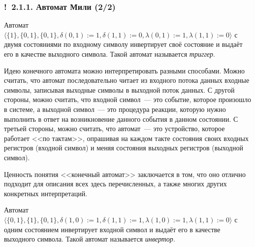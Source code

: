 \documentclass[mathserif,12pt,aspectratio=169]{beamer}
\renewcommand{\index}[1]{}
\def\odmkey#1#2{{\it\color{red} #1}\index{#2}}
\def\Assign{\operatorname{:=}}
\def\Ok{{\color{green}\textbf{!}\ }}
\begin{document}
\begin{frame}
\frametitle{\Ok 2.1.1. Автомат Мили (2/2)}
\begin{example}
Автомат $\langle \{1\},
\{0,1\}, \{0,1\},\delta(0,1)\Assign 1,
\delta(1,1)\Assign 0, \lambda(0,1)\Assign 1,\lambda(1,1)\Assign 0\rangle$
с двумя состояниями
по входному символу инвертирует своё состояние
и выдаёт его в качестве выходного символа.
Такой автомат называется \odmkey{триггер}{Триггер}.   
\end{example}
\begin{digress}
Идею конечного автомата можно интерпретировать разными способами.
Можно считать, что  автомат последовательно читает из входного
потока данных входные символы, записывая выходные символы в
выходной поток данных. С другой стороны, можно считать, что
входной символ~--- это событие, которое произошло в системе, а
выходной символ~--- это процедура реакции, которую нужно выполнить
в ответ на возникновение данного события в данном состоянии. С
третьей стороны, можно считать, что автомат~--- это устройство,
которое работает <<по тактам>>, опрашивая на каждом такте
состояния своих входных регистров (входной символ) и меняя
состояния выходных регистров (выходной символ).

\smallskip
Ценность понятия <<конечный автомат>> заключается в том, что оно
отлично подходит для описания всех здесь перечисленных, а также
многих других конкретных интерпретаций.
\end{digress}

\medskip
\begin{example}
Автомат $\langle \{0, 1\},
\{1\}, \{0,1\},\delta(1,0)\Assign 1,
\delta(1,1)\Assign 1, \lambda(1,0)\Assign 1,\lambda(1,1)\Assign 0\rangle$
с одним состоянием
 инвертирует входной символ 
и выдаёт его в качестве выходного символа.
Такой автомат называется \odmkey{инвертор}{Инвертор}.   
\end{example}


\end{frame}
\end{document}
